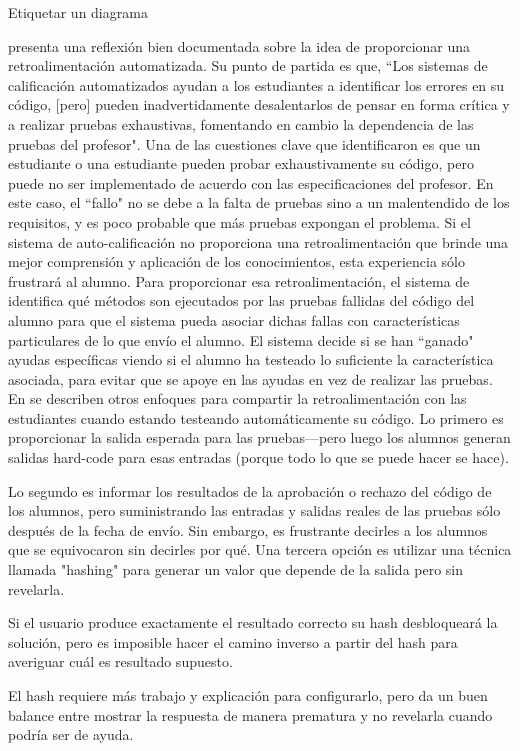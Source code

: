 \begin{aside}{Etiquetar un diagrama}
{\cite{Buff2015} presenta una reflexión bien documentada sobre la idea de proporcionar una retroalimentación automatizada.
Su punto de partida es que, 
``Los sistemas de calificación automatizados ayudan a los estudiantes a identificar los errores en su código, 
[pero] pueden inadvertidamente desalentarlos de pensar en forma crítica y a realizar pruebas exhaustivas, 
fomentando en cambio  la dependencia de las pruebas del profesor".
Una de las cuestiones clave que identificaron es que un estudiante o una estudiante pueden probar exhaustivamente su código, pero puede no ser implementado de acuerdo con las especificaciones del profesor.
En este caso, 
el ``fallo" no se debe a la falta de pruebas sino a un malentendido de los requisitos, y es poco probable que más pruebas expongan el problema.
Si el sistema de auto-calificación no proporciona una retroalimentación que brinde una mejor comprensión y aplicación de los conocimientos, esta experiencia sólo frustrará al alumno.
Para proporcionar esa retroalimentación, 
el sistema de \cite{Buff2015} identifica qué métodos son ejecutados por las pruebas fallidas del código del alumno 
para que el sistema pueda asociar dichas fallas con características particulares de lo que envío el alumno.
El sistema decide si se han ``ganado" ayudas específicas viendo si el alumno ha testeado lo suficiente la característica asociada, para evitar que se apoye en las ayudas en vez de realizar las pruebas.
En \cite{Srid2016} se describen otros enfoques para compartir la retroalimentación con las estudiantes 
cuando estando testeando automáticamente su código.
Lo primero es proporcionar la salida esperada para las pruebas---pero 
luego los alumnos generan salidas hard-code para esas entradas 
(porque todo lo que se puede hacer se hace).

Lo segundo es informar  los resultados de la aprobación o rechazo del código de los alumnos, 
pero suministrando las entradas y salidas reales de las pruebas sólo después de la fecha de envío.
Sin embargo, 
es frustrante decirles a los alumnos que se equivocaron sin decirles por qué.
Una tercera opción es utilizar una técnica llamada "hashing" para generar un valor que depende de la salida pero sin revelarla.

Si el usuario produce exactamente el resultado correcto
su hash desbloqueará la solución, 
pero es imposible hacer el camino inverso a partir del hash para averiguar cuál es resultado supuesto.

El hash requiere más trabajo y explicación para configurarlo, 
pero da un buen balance entre mostrar la respuesta de manera prematura y no revelarla cuando podría ser de ayuda.

}
\end{aside}
